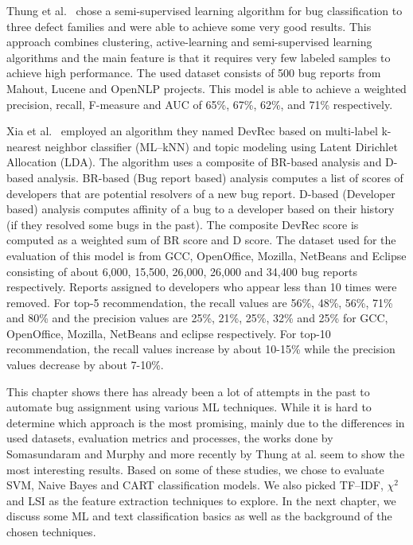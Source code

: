 Thung et al.~\cite{Thung2015} chose a semi-supervised learning algorithm for bug classification to three defect families and were able to achieve some very good results. This approach combines clustering, active-learning and semi-supervised learning algorithms and the main feature is that it requires very few labeled samples to achieve high performance. The used dataset consists of 500 bug reports from Mahout, Lucene and OpenNLP projects. This model is able to achieve a weighted precision, recall, F-measure and AUC of 65\%, 67\%, 62\%, and 71\%
 respectively.

Xia et al.~\cite{Xia2015} employed an algorithm they named DevRec based on multi-label k-nearest neighbor classifier (ML--kNN) and topic modeling using Latent Dirichlet Allocation (LDA). The algorithm uses a composite of BR-based analysis and D-based analysis. BR-based (Bug report based) analysis computes a list of scores of developers that are potential resolvers of a new bug report. D-based (Developer based) analysis computes affinity of a bug to a developer based on their history (if they resolved some bugs in the past). The composite DevRec score is computed as a weighted sum of BR score and D score. The dataset used for the evaluation of this model is from GCC, OpenOffice, Mozilla, NetBeans and Eclipse consisting of about 6,000, 15,500, 26,000, 26,000 and 34,400 bug reports respectively. Reports assigned to developers who appear less than 10 times were removed. For top-5 recommendation, the recall values are 56\%, 48\%, 56\%, 71\% and 80\% and the precision values are 25\%, 21\%, 25\%, 32\% and 25\% for GCC, OpenOffice, Mozilla, NetBeans and eclipse respectively. For top-10 recommendation, the recall values increase by about 10-15\% while the precision values decrease by about 7-10\%.

This chapter shows there has already been a lot of attempts in the past to automate bug assignment using various ML techniques. While it is hard to determine which approach is the most promising, mainly due to the differences in used datasets, evaluation metrics and processes, the works done by Somasundaram and Murphy and more recently by Thung at al. seem to show the most interesting results. Based on some of these studies, we chose to evaluate SVM, Naive Bayes and CART classification models. We also picked TF--IDF, $\chi^2$ and LSI as the feature extraction techniques to explore. In the next chapter, we discuss some ML and text classification basics as well as the background of the chosen techniques.
